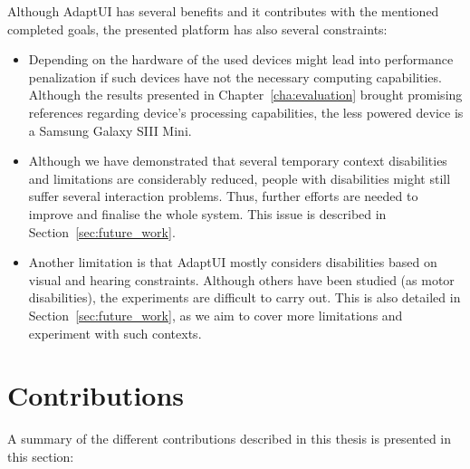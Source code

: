 Although AdaptUI has several benefits and it contributes with the mentioned 
completed goals, the presented platform has also several constraints:

\begin{itemize}
  \item Depending on the hardware of the used devices might lead into 
  performance penalization if such devices have not the necessary computing
  capabilities. Although the results presented in 
  Chapter~\ref{cha:evaluation} brought promising references regarding device's 
  processing capabilities, the less powered device is a Samsung Galaxy SIII Mini.
  
  \item Although we have demonstrated that several temporary context 
  disabilities and limitations are considerably reduced, people with 
  disabilities might still suffer several interaction problems. Thus, further 
  efforts are needed to improve and finalise the whole system. This issue is 
  described in Section~\ref{sec:future_work}.
  
  \item Another limitation is that AdaptUI mostly considers disabilities based
  on visual and hearing constraints. Although others have been studied (as motor
  disabilities), the experiments are difficult to carry out. This is also 
  detailed in Section~\ref{sec:future_work}, as we aim to cover more limitations 
  and experiment with such contexts.
\end{itemize}


\section{Contributions}
\label{sec:contributions}

A summary of the different contributions described in this thesis is presented 
in this section: 

